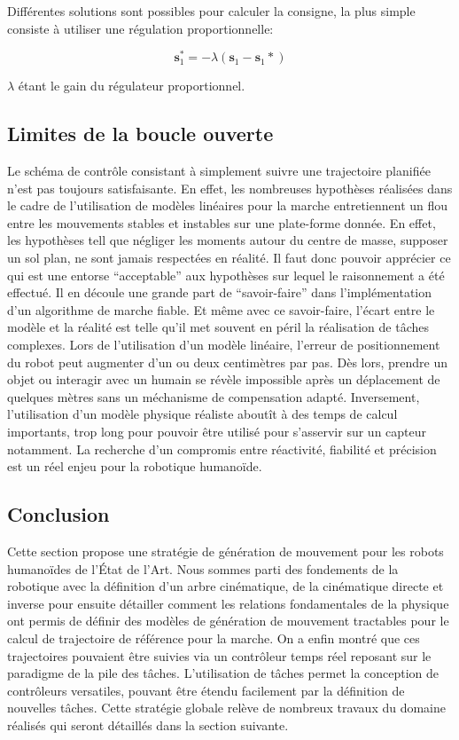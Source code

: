 Différentes solutions sont possibles pour calculer la consigne, la
plus simple consiste à utiliser une régulation proportionnelle:

\begin{equation}
  \mathbf{s}_1^{*} = -\lambda (\mathbf{s}_1 - \mathbf{s}_1{*})
\end{equation}

$\lambda$ étant le gain du régulateur proportionnel.


\subsection{Limites de la boucle ouverte}


Le schéma de contrôle consistant à simplement suivre une trajectoire
planifiée n'est pas toujours satisfaisante. En effet, les nombreuses
hypothèses réalisées dans le cadre de l'utilisation de modèles
linéaires pour la marche entretiennent un flou entre les mouvements
stables et instables sur une plate-forme donnée. En effet, les
hypothèses tell que négliger les moments autour du centre de masse,
supposer un sol plan, ne sont jamais respectées en réalité. Il faut
donc pouvoir apprécier ce qui est une entorse ``acceptable'' aux
hypothèses sur lequel le raisonnement a été effectué. Il en découle
une grande part de ``savoir-faire'' dans l'implémentation d'un
algorithme de marche fiable. Et même avec ce savoir-faire, l'écart
entre le modèle et la réalité est telle qu'il met souvent en péril la
réalisation de tâches complexes. Lors de l'utilisation d'un modèle
linéaire, l'erreur de positionnement du robot peut augmenter d'un ou
deux centimètres par pas. Dès lors, prendre un objet ou interagir avec
un humain se révèle impossible après un déplacement de quelques mètres
sans un méchanisme de compensation adapté. Inversement, l'utilisation
d'un modèle physique réaliste aboutît à des temps de calcul
importants, trop long pour pouvoir être utilisé pour s'asservir sur un
capteur notamment. La recherche d'un compromis entre réactivité,
fiabilité et précision est un réel enjeu pour la robotique humanoïde.


\subsection{Conclusion}

Cette section propose une stratégie de génération de mouvement pour
les robots humanoïdes de l'État de l'Art. Nous sommes parti des
fondements de la robotique avec la définition d'un arbre cinématique,
de la cinématique directe et inverse pour ensuite détailler comment
les relations fondamentales de la physique ont permis de définir des
modèles de génération de mouvement tractables pour le calcul de
trajectoire de référence pour la marche. On a enfin montré que ces
trajectoires pouvaient être suivies via un contrôleur temps réel
reposant sur le paradigme de la pile des tâches. L'utilisation de
tâches permet la conception de contrôleurs versatiles, pouvant être
étendu facilement par la définition de nouvelles tâches. Cette
stratégie globale relève de nombreux travaux du domaine réalisés qui
seront détaillés dans la section suivante.



